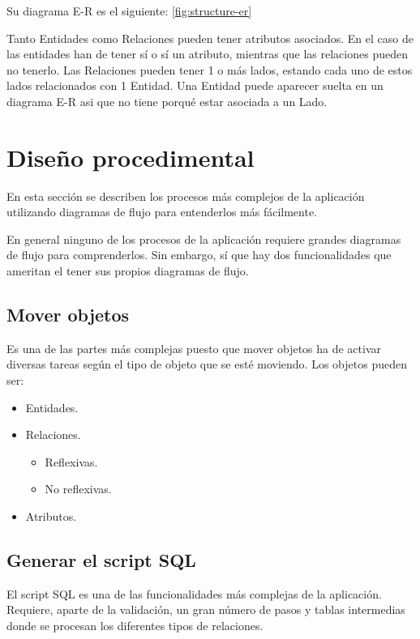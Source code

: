Su diagrama E-R es el siguiente: \ref{fig:structure-er}

Tanto Entidades como Relaciones pueden tener atributos asociados. En el caso de las entidades han de tener sí o sí un atributo, mientras que las relaciones pueden no tenerlo.
Las Relaciones pueden tener 1 o más lados, estando cada uno de estos lados relacionados con 1 Entidad. Una Entidad puede aparecer suelta en un diagrama E-R asi que no tiene porqué estar asociada a un Lado.

\section{Diseño procedimental}
En esta sección se describen los procesos más complejos de la aplicación utilizando diagramas de flujo para entenderlos más fácilmente.

En general ninguno de los procesos de la aplicación requiere grandes diagramas de flujo para comprenderlos. Sin embargo, sí que hay dos funcionalidades que ameritan el tener sus propios diagramas de flujo.

\subsection{Mover objetos}
Es una de las partes más complejas puesto que mover objetos ha de activar diversas tareas según el tipo de objeto que se esté moviendo.
Los objetos pueden ser:
\begin{itemize}
    \item Entidades.
    \item Relaciones.
    \begin{itemize}
        \item Reflexivas.
        \item No reflexivas.
    \end{itemize}
    \item Atributos.
\end{itemize}


\subsection{Generar el script SQL}
El script SQL es una de las funcionalidades más complejas de la aplicación. Requiere, aparte de la validación, un gran número de pasos y tablas intermedias donde se procesan los diferentes tipos de relaciones.


